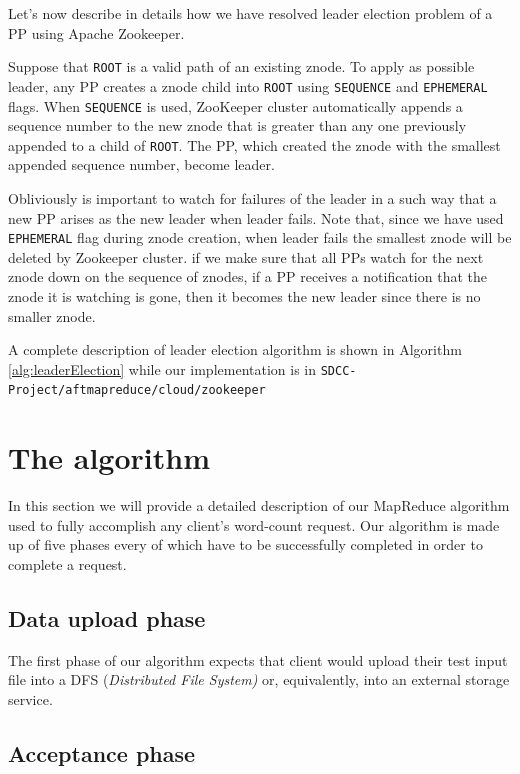 \documentclass[sigchi]{acmart}
\begin{document}
Let's now describe in details how we have resolved leader election problem of a PP using Apache Zookeeper.

Suppose that \texttt{ROOT} is a valid path of an existing znode. To apply as possible leader, any PP creates a znode child into \texttt{ROOT} using \texttt{SEQUENCE} and \texttt{EPHEMERAL} flags. When \texttt{SEQUENCE} is used, ZooKeeper cluster automatically appends a sequence number to the new znode that is greater than any one previously appended to a child of \texttt{ROOT}. The PP, which created the znode with the smallest appended sequence number, become leader.

Obliviously is important to watch for failures of the leader in a such way that a new PP arises as the new leader when leader fails. Note that, since we have used \texttt{EPHEMERAL} flag during znode creation, when leader fails the smallest znode will be deleted by Zookeeper cluster. if we make sure that all PPs watch for the next znode down on the sequence of znodes, if a PP receives a notification that the znode it is watching is gone, then it becomes the new leader since there is no smaller znode. 

A complete description of leader election algorithm is shown in Algorithm \ref{alg:leaderElection} while our implementation is in \texttt{SDCC-Project/aftmapreduce/cloud/zookeeper}

\section{The algorithm}

In this section we will provide a detailed description of our MapReduce algorithm used to fully accomplish any client's word-count request. Our algorithm is made up of five phases every of which have to be successfully completed in order to complete a request.

\subsection{Data upload phase}

The first phase of our algorithm expects that client would upload their test input file into a DFS (\textit{Distributed File System)} or, equivalently, into an external storage service.



\subsection{Acceptance phase}
\end{document}
